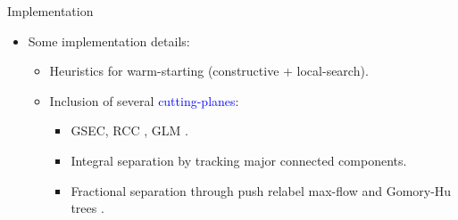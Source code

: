 \begin{frame}{Implementation}
	\begin{itemize}
		\item Some implementation details:
		      \begin{itemize}
			      \item Heuristics for warm-starting (constructive + local-search).
			      \item Inclusion of several \textcolor{blue}{cutting-planes}:
			            \begin{itemize}
				            \item GSEC, RCC \parencite{laporte1983}, GLM \parencite{gouveia1995}.
				            \item Integral separation by tracking major connected components.
				            \item Fractional separation through push relabel max-flow \parencite{goldberg1997} and Gomory-Hu trees \parencite{gomory1961}.
			            \end{itemize}
		      \end{itemize}
	\end{itemize}
\end{frame}

